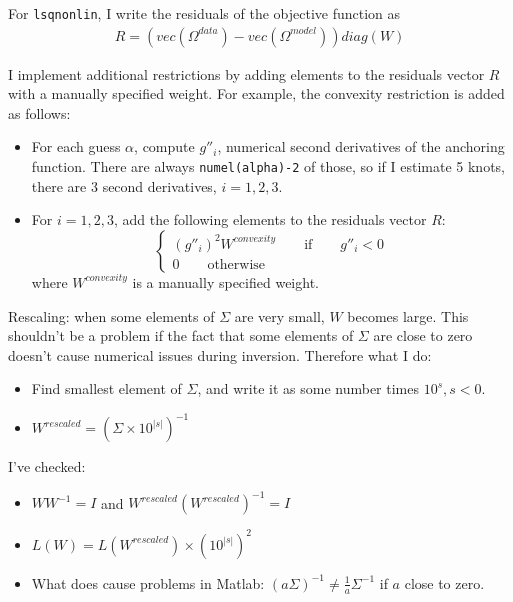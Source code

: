 \documentclass[11pt]{article}
\renewcommand{\[}{\begin{equation}}
\renewcommand{\]}{\end{equation}}
\begin{document}
For \texttt{lsqnonlin}, I write the residuals of the objective function as
\begin{align}
R = (vec(\Omega^{data}) - vec(\Omega^{model})) diag(W)
\end{align}

I implement additional restrictions by adding elements to the residuals vector $R$ with a manually specified weight. For example, the convexity restriction is added as follows:
\begin{itemize}
\item For each guess $\alpha$, compute $g''_i$, numerical second derivatives of the anchoring function. There are always \texttt{numel(alpha)-2} of those, so if I estimate 5 knots, there are 3 second derivatives, $i=1,2,3$. 
\item For $i=1,2,3$, add the following elements to the residuals vector $R$: 
\begin{equation}
\begin{cases} (g''_i)^2 W^{convexity} \quad \quad \text{if} \quad \quad g''_i < 0 \\
0  \quad \quad \text{otherwise} \end{cases}
\end{equation}
where $W^{convexity}$ is a manually specified weight.
\end{itemize}

Rescaling: when some elements of $\Sigma$ are very small, $W$ becomes large. This shouldn't be a problem if the fact that some elements of $\Sigma$ are close to zero doesn't cause numerical issues during inversion. Therefore what I do:
\begin{itemize}
\item Find smallest element of $\Sigma$, and write it as some number times $10^s, s<0$. 
\item $W^{rescaled} = (\Sigma \times 10^{|s|})^{-1}$
\end{itemize}


I've checked:
\begin{itemize}
\item $W W^{-1} = I$ and $W^{rescaled} (W^{rescaled})^{-1} = I$
\item $L(W) = L(W^{rescaled}) \times (10^{|s|})^2$
\item What does cause problems in Matlab: $(a\Sigma)^{-1} \neq \frac{1}{a}\Sigma^{-1}$ if $a$ close to zero.
\end{itemize}
\end{document}

